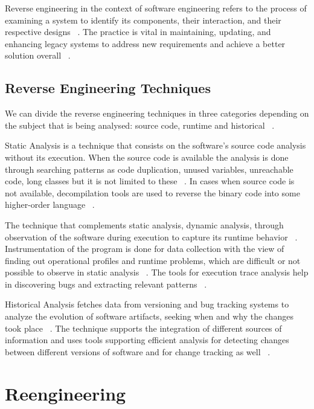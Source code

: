 Reverse engineering in the context of software engineering refers to the process of examining a system to identify its components, their interaction, and their respective designs  ~\cite{ReverseEngineering2011}. The practice is vital in maintaining, updating, and enhancing legacy systems to address new requirements and achieve a better solution overall ~\cite{ReverseEngineering2011}.

\subsection{Reverse Engineering Techniques}

We can divide the reverse engineering techniques in three categories depending on the subject that is being analysed: source code, runtime and historical ~\cite{ReverseEngineering1990}. 

Static Analysis is a technique that consists on the software's source code analysis without its execution. When the source code is available the analysis is done through searching patterns as code duplication, unused variables, unreachable code, long classes but it is not limited to these ~\cite{ReverseEngineering1990}. In cases when source code is not available, decompilation tools are used to reverse the binary code into some higher-order language ~\cite{ReverseEngineering1990}.

The technique that complements static analysis, dynamic analysis, through observation of the software during execution to capture its runtime behavior ~\cite{ReverseEngineering2011}. Instrumentation of the program is done for data collection with the view of finding out operational profiles and runtime problems, which are difficult or not possible to observe in static analysis ~\cite{ReverseEngineering2011}. The tools for execution trace analysis help in discovering bugs and extracting relevant patterns ~\cite{ReverseEngineering1990}.

Historical Analysis fetches data from versioning and bug tracking systems to analyze the evolution of software artifacts, seeking when and why the changes took place ~\cite{ReverseEngineering2011}. The technique supports the integration of different sources of information and uses tools supporting efficient analysis for detecting changes between different versions of software and for change tracking as well ~\cite{ReverseEngineering1990}.


\section{Reengineering}

